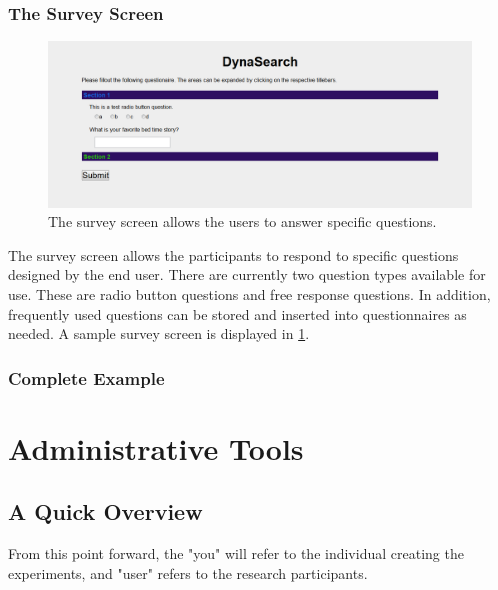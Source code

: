 \documentclass[article]{ij4uq}              %
\begin{document}
\subsubsection{The Survey Screen}

\begin{figure}[h!]
 \centering
 \includegraphics[width=5.0in]{figures/survey_page.png}
 \caption{The survey screen allows the users to answer specific questions.}
 \label{fig:survey}
\end{figure}
\FloatBarrier

The survey screen allows the participants to respond to specific questions designed by the end user. There are currently two question types available for use.  These are radio button questions and free response questions.  In addition, frequently used questions can be stored and inserted into questionnaires as needed.  A sample survey screen is displayed in \ref{fig:survey}.

\subsubsection{Complete Example}



\section{Administrative Tools}

\subsection{A Quick Overview}
From this point forward, the "you" will refer to the individual creating the experiments, and "user" refers to the research participants. 
\end{document}
